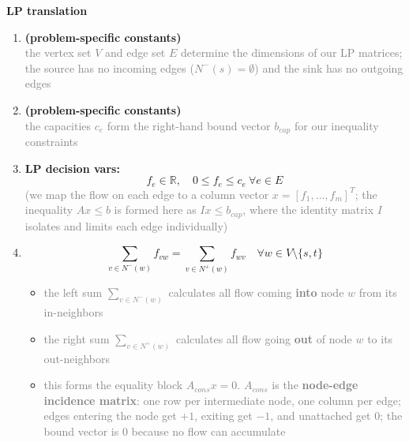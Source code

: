 \documentclass[a4paper, 11pt]{report}
\begin{document}
\begin{minipage}[t]{0.51\textwidth}
    \raggedright
    \textbf{LP translation}\\[2mm]
    \begin{enumerate}
        \item \textbf{(problem-specific constants)} \\
        \textcolor{gray}{\small the vertex set $V$ and edge set $E$ determine the dimensions of our LP matrices; the source has no incoming edges ($N^-(s) = \emptyset$) and the sink has no outgoing edges}
        \vspace{2mm}
        
        \item \textbf{(problem-specific constants)} \\
        \textcolor{gray}{\small the capacities $c_e$ form the right-hand bound vector $b_{cap}$ for our inequality constraints}
        \vspace{2mm}
        
        \item \textbf{LP decision vars:} 
            $$f_e \in \mathbb{R}, \quad 0 \le f_e \le c_e \ \forall e \in E$$
            \textcolor{gray}{\small (we map the flow on each edge to a column vector $x = [f_1, \dots, f_m]^T$; the inequality $Ax \le b$ is formed here as $Ix \le b_{cap}$, where the identity matrix $I$ isolates and limits each edge individually)}
            \vspace{2mm}
            
        \item $$\displaystyle \sum_{v \in N^-(w)} f_{vw} = \sum_{v \in N^+(w)} f_{wv} \quad \forall w \in V \setminus \{s, t\}$$ 
        \vspace{-3mm}
        \begin{itemize}
            \item \textcolor{gray}{\small the left sum $\sum_{v \in N^-(w)}$ calculates all flow coming \textbf{into} node $w$ from its in-neighbors}
            \item \textcolor{gray}{\small the right sum $\sum_{v \in N^+(w)}$ calculates all flow going \textbf{out} of node $w$ to its out-neighbors}
            \item \textcolor{gray}{\small this forms the equality block $A_{cons} x = 0$. $A_{cons}$ is the \textbf{node-edge incidence matrix}: one row per intermediate node, one column per edge; edges entering the node get $+1$, exiting get $-1$, and unattached get $0$; the bound vector is $0$ because no flow can accumulate}
        \end{itemize}
        \vspace{2mm}
        

\end{enumerate}
\end{minipage}
\end{document}
